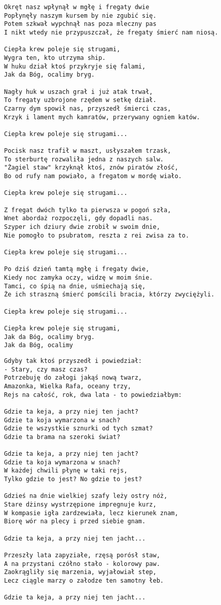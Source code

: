 \documentclass[12pt]{article}
\begin{document}
\begin{verbatim}
Okręt nasz wpłynął w mgłę i fregaty dwie
Popłynęły naszym kursem by nie zgubić się.
Potem szkwał wypchnął nas poza mleczny pas
I nikt wtedy nie przypuszczał, że fregaty śmierć nam niosą.

Ciepła krew poleje się strugami,
Wygra ten, kto utrzyma ship.
W huku dział ktoś przykryje się falami,
Jak da Bóg, ocalimy bryg.

Nagły huk w uszach grał i już atak trwał,
To fregaty uzbrojone rzędem w setkę dział.
Czarny dym spowił nas, przyszedł śmierci czas,
Krzyk i lament mych kamratów, przerywany ogniem katów.

Ciepła krew poleje się strugami...

Pocisk nasz trafił w maszt, usłyszałem trzask,
To sterburtę rozwaliła jedna z naszych salw.
"Żagiel staw" krzyknął ktoś, znów piratów złość,
Bo od rufy nam powiało, a fregatom w mordę wiało.

Ciepła krew poleje się strugami...

Z fregat dwóch tylko ta pierwsza w pogoń szła,
Wnet abordaż rozpoczęli, gdy dopadli nas.
Szyper ich dziury dwie zrobił w swoim dnie,
Nie pomogło to psubratom, reszta z rei zwisa za to.

Ciepła krew poleje się strugami...

Po dziś dzień tamtą mgłę i fregaty dwie,
Kiedy noc zamyka oczy, widzę w moim śnie.
Tamci, co śpią na dnie, uśmiechają się,
Że ich straszną śmierć pomścili bracia, którzy zwyciężyli.

Ciepła krew poleje się strugami...

Ciepła krew poleje się strugami,
Jak da Bóg, ocalimy bryg.
Jak da Bóg, ocalimy
\end{verbatim}
\clearpage

\begin{verbatim}
Gdyby tak ktoś przyszedł i powiedział:
- Stary, czy masz czas?
Potrzebuję do załogi jakąś nową twarz,
Amazonka, Wielka Rafa, oceany trzy,
Rejs na całość, rok, dwa lata - to powiedziałbym:

Gdzie ta keja, a przy niej ten jacht?
Gdzie ta koja wymarzona w snach?
Gdzie te wszystkie sznurki od tych szmat?
Gdzie ta brama na szeroki świat?

Gdzie ta keja, a przy niej ten jacht?
Gdzie ta koja wymarzona w snach?
W każdej chwili płynę w taki rejs,
Tylko gdzie to jest? No gdzie to jest?

Gdzieś na dnie wielkiej szafy leży ostry nóż,
Stare dżinsy wystrzępione impregnuje kurz,
W kompasie igła zardzewiała, lecz kierunek znam,
Biorę wór na plecy i przed siebie gnam.

Gdzie ta keja, a przy niej ten jacht...

Przeszły lata zapyziałe, rzęsą porósł staw,
A na przystani czółno stało - kolorowy paw.
Zaokrągliły się marzenia, wyjałowiał step,
Lecz ciągle marzy o załodze ten samotny łeb.

Gdzie ta keja, a przy niej ten jacht...
\end{verbatim}
\clearpage
\end{document}
